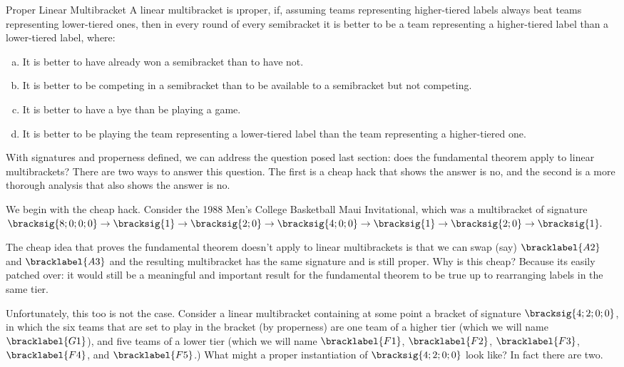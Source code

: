 {    \begin{definition}{Proper Linear Multibracket}{}
        A linear multibracket is \i{proper}, if, assuming teams representing higher-tiered labels always beat teams representing lower-tiered ones, then in every round of every semibracket it is better to be a team representing a higher-tiered label than a lower-tiered label, where:
        \begin{enumerate}[(a)]
            \item It is better to have already won a semibracket than to have not.
            \item It is better to be competing in a semibracket than to be available to a semibracket but not competing.
            \item It is better to have a bye than be playing a game.
            \item It is better to be playing the team representing a lower-tiered label than the team representing a higher-tiered one.
        \end{enumerate}
    \end{definition}

    With signatures and properness defined, we can address the question posed last section: does the fundamental theorem apply to linear multibrackets? There are two ways to answer this question. The first is a cheap hack that shows the answer is no, and the second is a more thorough analysis that also shows the answer is no.

    We begin with the cheap hack. Consider the 1988 Men's College Basketball Maui Invitational, which was a multibracket of signature $\bracksig{8;0;0;0} \to \bracksig{1} \to \bracksig{2;0} \to \bracksig{4;0;0} \to \bracksig{1} \to \bracksig{2;0} \to \bracksig{1}.$


    The cheap idea that proves the fundamental theorem doesn't apply to linear multibrackets is that we can swap (say) $\bracklabel{A2}$ and $\bracklabel{A3}$ and the resulting multibracket has the same signature and is still proper. Why is this cheap? Because its easily patched over: it would still be a meaningful and important result for the fundamental theorem to be true up to rearranging labels in the same tier.

    Unfortunately, this too is not the case. Consider a linear multibracket containing at some point a bracket of signature $\bracksig{4;2;0;0}$, in which the six teams that are set to play in the bracket (by properness) are one team of a higher tier (which we will name $\bracklabel{G1}$), and five teams of a lower tier (which we will name $\bracklabel{F1}$, $\bracklabel{F2}$, $\bracklabel{F3}$, $\bracklabel{F4}$, and $\bracklabel{F5}$.) What might a proper instantiation of $\bracksig{4;2;0;0}$ look like? In fact there are two.

}
